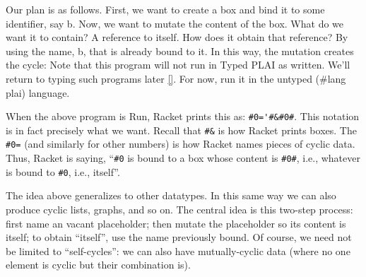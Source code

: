 Our plan is as follows. First, we want to create a box and bind it to some
identifier, say b. Now, we want to mutate the content of the box. What do we
want it to contain? A reference to itself. How does it obtain that reference? By
using the name, b, that is already bound to it. In this way, the mutation
creates the cycle:
Note that this program will not run in Typed PLAI as written. We’ll return to
typing such programs later \ref{}. For now, run it in the untyped (\#lang plai)
language.

When the above program is Run, Racket prints this as: \verb|#0='#&#0#|. This
notation is in fact precisely what we want. Recall that \verb|#&| is how Racket
prints boxes. The \verb|#0=| (and similarly for other numbers) is how Racket
names pieces of cyclic data. Thus, Racket is saying, “\verb|#0| is bound to a
box whose content is \verb|#0#|, i.e., whatever is bound to \verb|#0|, i.e.,
itself”.


The idea above generalizes to other datatypes. In this same way we can also
produce cyclic lists, graphs, and so on. The central idea is this two-step
process: first name an vacant placeholder; then mutate the placeholder so its
content is itself; to obtain “itself”, use the name previously bound. Of course,
we need not be limited to “self-cycles”: we can also have mutually-cyclic data
(where no one element is cyclic but their combination is).

